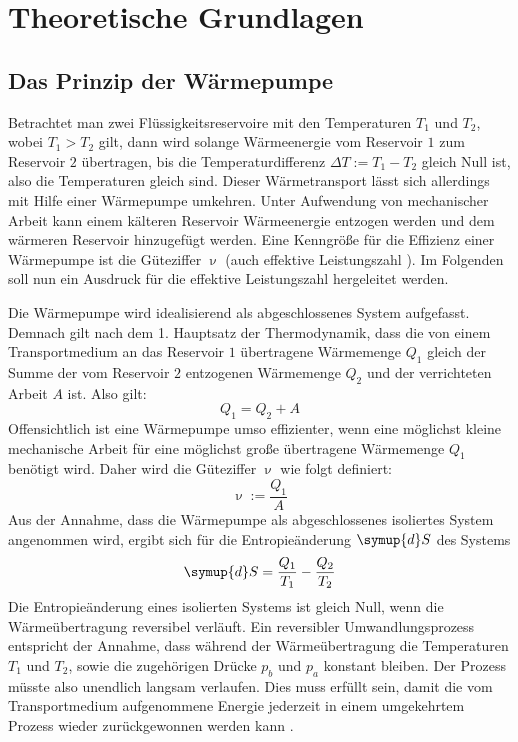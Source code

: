 \section{Theoretische Grundlagen}
\label{sec:Theorie}

\subsection{Das Prinzip der Wärmepumpe}
Betrachtet man zwei Flüssigkeitsreservoire mit den Temperaturen $T_1$ und $T_2$, wobei $T_1 > T_2$ gilt, dann wird solange Wärmeenergie vom Reservoir $1$ zum Reservoir $2$ übertragen, bis die Temperaturdifferenz $\Delta T := T_1 - T_2$ gleich Null ist, also die Temperaturen gleich sind.
Dieser Wärmetransport lässt sich allerdings mit Hilfe einer Wärmepumpe umkehren. Unter Aufwendung von mechanischer Arbeit kann einem kälteren Reservoir Wärmeenergie entzogen werden und dem wärmeren Reservoir hinzugefügt werden.
Eine Kenngröße für die Effizienz einer Wärmepumpe ist die Güteziffer $\upnu$ (auch effektive Leistungszahl \cite{geschke}). Im Folgenden soll nun ein Ausdruck für die effektive Leistungszahl hergeleitet werden.

Die Wärmepumpe wird idealisierend als abgeschlossenes System aufgefasst.
Demnach gilt nach dem 1. Hauptsatz der Thermodynamik, dass die von einem Transportmedium an das Reservoir $1$ übertragene Wärmemenge $Q_1$ gleich der Summe der vom Reservoir $2$ entzogenen Wärmemenge $Q_2$ und der verrichteten Arbeit $A$ ist. Also gilt:
\begin{equation}
	\label{eqn:dQ}
	Q_1 = Q_2 + A
\end{equation}
Offensichtlich ist eine Wärmepumpe umso effizienter, wenn eine möglichst kleine mechanische Arbeit für eine möglichst große übertragene Wärmemenge $Q_1$ benötigt wird. Daher wird die Güteziffer $\upnu$ wie folgt definiert:
\begin{equation}
	\label{eqn:guete}
	\upnu := \frac{Q_1}{A}
\end{equation}
Aus der Annahme, dass die Wärmepumpe als abgeschlossenes isoliertes System angenommen wird, ergibt sich für die Entropieänderung $\symup{d}S$ des Systems
\begin{equation}
	\label{eqn:entropie}
	\symup{d}S = \frac{Q_1}{T_1} - \frac{Q_2}{T_2}
\end{equation}
Die Entropieänderung eines isolierten Systems ist gleich Null, wenn die Wärmeübertragung reversibel verläuft. 
Ein reversibler Umwandlungsprozess entspricht der Annahme, dass während der Wärmeübertragung die Temperaturen $T_1$ und $T_2$, sowie die zugehörigen Drücke $p_b$ und $p_a$ konstant bleiben. Der Prozess müsste also unendlich langsam verlaufen. 
Dies muss erfüllt sein, damit die vom Transportmedium aufgenommene Energie jederzeit in einem umgekehrtem Prozess wieder zurückgewonnen werden kann \cite{Anleitung}.


